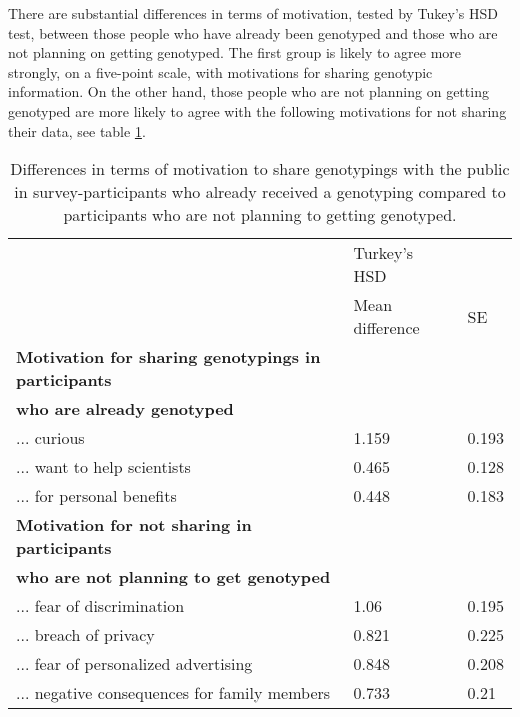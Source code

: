 \documentclass[10pt]{article}
\begin{document}
There are substantial differences in terms of motivation, tested by Tukey's HSD test, between those people who have already been genotyped 
and those who are not planning on getting genotyped. The first group is likely to agree more strongly, on a five-point scale, with motivations for sharing genotypic information. On the other hand, those people who are not planning on getting genotyped are more likely to agree with the following motivations 
for not sharing their data, see table \ref{tab:motivations1}.

\begin{table}
\begin{tabular}{|l|l|l|}
\hline
& Turkey's HSD & \\ \cline{2-3}
& Mean difference & SE \\ \hline
\textbf{Motivation for sharing genotypings in participants} & & \\
\textbf{who are already genotyped} & & \\ \hline 
... curious & 1.159 & 0.193 \\ 
... want to help scientists & 0.465 & 0.128 \\
... for personal benefits & 0.448 & 0.183 \\ \hline
\textbf{Motivation for not sharing in participants} & & \\ 
\textbf{who are not planning to get genotyped} & & \\ \hline
... fear of discrimination & 1.06 & 0.195 \\
... breach of privacy & 0.821 & 0.225 \\
... fear of personalized advertising & 0.848 & 0.208 \\ 
... negative consequences for family members & 0.733 & 0.21 \\ \hline 
\end{tabular}
\caption{Differences in terms of motivation to share genotypings with the public in survey-participants who already received a genotyping compared to participants who are not planning to getting genotyped. }
\label{tab:motivations1}
\end{table}
\end{document}
